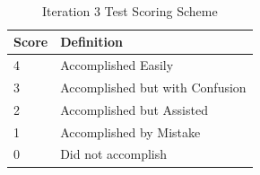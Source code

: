 \begin{table}
  \centering
  \caption{Iteration 3 Test Scoring Scheme}~\label{tab:itr3_scoring_scheme}
  \addtolength{\tabcolsep}{2pt} 
  \begin{tabular}{p{1cm}|p{5cm}}
  	\toprule
    \rule{0pt}{8pt}Score & Definition\\[2pt]
    \toprule
    4 & Accomplished Easily \\
    3 & Accomplished but with Confusion \\
    2 & Accomplished but Assisted \\
    1 & Accomplished by Mistake \\
    0 & Did not accomplish \\
    \bottomrule
  \end{tabular}
  \addtolength{\tabcolsep}{-2pt} 
\end{table}
